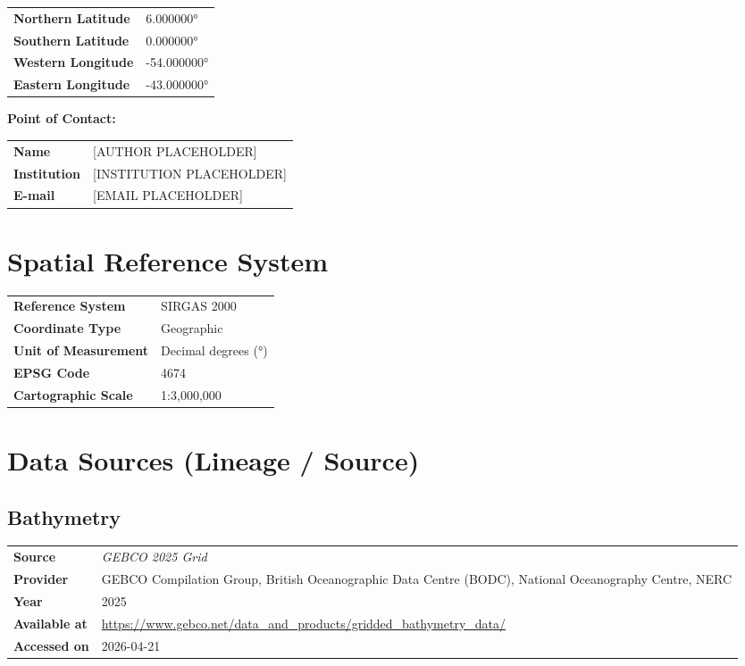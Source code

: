 \documentclass[12pt, a4paper]{article}
\begin{document}
\begin{tabular}{>{\bfseries}p{5cm} p{9cm}}
Northern Latitude   & 6.000000° \\
Southern Latitude   & 0.000000° \\
Western Longitude   & -54.000000° \\
Eastern Longitude   & -43.000000° \\
\end{tabular}

\vspace{0.5em}
\noindent\textbf{Point of Contact:}

\begin{tabular}{>{\bfseries}p{5cm} p{9cm}}
Name          & [AUTHOR PLACEHOLDER] \\
Institution   & [INSTITUTION PLACEHOLDER] \\
E-mail        & [EMAIL PLACEHOLDER] \\
\end{tabular}

\section{Spatial Reference System}

\begin{tabular}{>{\bfseries}p{5cm} p{9cm}}
Reference System    & SIRGAS 2000 \\
Coordinate Type     & Geographic \\
Unit of Measurement & Decimal degrees (°) \\
EPSG Code           & 4674 \\
Cartographic Scale  & 1:3,000,000 \\
\end{tabular}

\section{Data Sources (Lineage / Source)}

\subsection{Bathymetry}
\begin{tabular}{>{\bfseries}p{5cm} p{9cm}}
Source    & \textit{GEBCO 2025 Grid} \\
Provider  & GEBCO Compilation Group, British Oceanographic Data Centre (BODC), National Oceanography Centre, NERC \\
Year      & 2025 \\
Available at & \url{https://www.gebco.net/data_and_products/gridded_bathymetry_data/} \\
Accessed on  & 2026-04-21 \\
\end{tabular}
\end{document}
